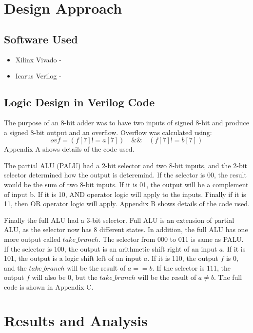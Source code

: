 \documentclass[12pt, letterpaper]{article}
\begin{document}
\newpage
\section{Design Approach}

\subsection{Software Used}
\begin{itemize}
	\item Xilinx Vivado - 
	\item Icarus Verilog - 
\end{itemize}

\subsection{Logic Design in Verilog Code}
The purpose of an 8-bit adder was to have two inputs of signed 8-bit and produce a signed 8-bit output and an overflow. Overflow was calculated using:
\begin{equation}
  ovf = (f[7] != a[7]) \quad\&\&\quad (f[7] != b[7])
\end{equation}
Appendix A shows details of the code used.

The partial ALU (PALU) had a 2-bit selector and two 8-bit inputs, and the 2-bit selector determined how the output is deteremind. If the selector is 00, the result would be the sum of two 8-bit inputs. If it is 01, the output will be a complement of input b. If it is 10, AND operator logic will apply to the inputs. Finally if it is 11, then OR operator logic will apply. Appendix B shows details of the code used.

Finally the full ALU had a 3-bit selector. Full ALU is an extension of partial ALU, as the selector now has 8 different states. In addition, the full ALU has one more output called $take\_branch$. The selector from 000 to 011 is same as PALU. If the selector is 100, the output is an arithmetic shift right of an input $a$. If it is 101, the output is a logic shift left of an input $a$. If it is 110, the output $f$ is 0, and the $take\_branch$ will be the result of $a == b$. If the selector is 111, the output $f$ will also be 0, but the $take\_branch$ will be the result of $a \neq b$. The full code is shown in Appendix C.

\newpage
\section{Results and Analysis}
\end{document}
